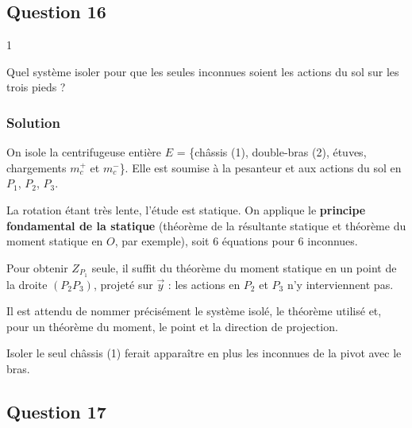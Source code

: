\documentclass[11pt,a4paper]{article}
\begin{document}
\hypertarget{question-16}{%
\subsection{Question 16}\label{question-16}}

\begin{indication}{1}

Quel système isoler pour que les seules inconnues soient les actions du sol sur les trois pieds ?

\end{indication}

\hypertarget{solution-15}{%
\subsubsection{Solution}\label{solution-15}}

On isole la centrifugeuse entière \(E\) = \{châssis (1), double-bras (2), étuves, chargements \(m_c^+\) et \(m_c^-\)\}. Elle est soumise à la pesanteur et aux actions du sol en \(P_1\), \(P_2\), \(P_3\).

La rotation étant très lente, l'étude est statique. On applique le \textbf{principe fondamental de la statique} (théorème de la résultante statique et théorème du moment statique en \(O\), par exemple), soit 6 équations pour 6 inconnues.

Pour obtenir \(Z_{P_1}\) seule, il suffit du théorème du moment statique en un point de la droite \((P_2P_3)\), projeté sur \(\vec y\) : les actions en \(P_2\) et \(P_3\) n'y interviennent pas.

\begin{jury}

Il est attendu de nommer précisément le système isolé, le théorème utilisé et, pour un théorème du moment, le point et la direction de projection.

\end{jury}

\begin{piege}

Isoler le seul châssis (1) ferait apparaître en plus les inconnues de la pivot avec le bras.

\end{piege}

\hypertarget{question-17}{%
\subsection{Question 17}\label{question-17}}
\end{document}
